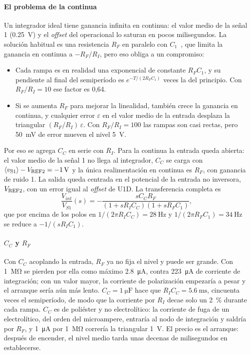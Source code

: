 \paragraph*{El problema de la continua} Un integrador ideal tiene ganancia infinita en continua: el valor medio de la señal 1 (\SI{0,25}{\volt}) y el \emph{offset} del operacional lo saturan en pocos milisegundos. La solución habitual es una resistencia $R_F$ en paralelo con $C_1$~\cite{linares-intder}, que limita la ganancia en continua a $-R_F/R_I$, pero eso obliga a un compromiso:
\begin{itemize}[leftmargin=*, nosep]
    \item Cada rampa es en realidad una exponencial de constante $R_F C_1$, y su pendiente al final del semiperíodo es $e^{-T/(2 R_F C_1)}$ veces la del principio. Con $R_F/R_I = 10$ ese factor es 0,64.
    \item Si se aumenta $R_F$ para mejorar la linealidad, también crece la ganancia en continua, y cualquier error $\varepsilon$ en el valor medio de la entrada desplaza la triangular $(R_F/R_I)\,\varepsilon$. Con $R_F/R_I = 100$ las rampas son casi rectas, pero \SI{50}{\milli\volt} de error mueven el nivel \SI{5}{\volt}.
\end{itemize}
Por eso se agrega $C_C$ en serie con $R_I$. Para la continua la entrada queda abierta: el valor medio de la señal 1 no llega al integrador, $C_C$ se carga con $\langle v_{\mathrm{S1}} \rangle - V_{\mathrm{REF2}} = \SI{-1}{\volt}$ y la única realimentación en continua es $R_F$, con ganancia de ruido 1. La salida queda centrada en el potencial de la entrada no inversora, $V_{\mathrm{REF2}}$, con un error igual al \emph{offset} de U1D. La transferencia completa es
\begin{equation}
\frac{V_{int}}{V_{S1}}(s) = -\frac{s C_C R_F}{(1 + s R_I C_C)(1 + s R_F C_1)},
\end{equation}
que por encima de los polos en $1/(2\pi R_I C_C) = \SI{28}{\hertz}$ y $1/(2\pi R_F C_1) = \SI{34}{\hertz}$ se reduce a $-1/(s R_I C_1)$.

\paragraph*{$C_C$ y $R_F$} Con $C_C$ acoplando la entrada, $R_F$ ya no fija el nivel y puede ser grande. Con \SI{1}{\mega\ohm} se pierden por ella como máximo \SI{2,8}{\micro\ampere}, contra \SI{223}{\micro\ampere} de corriente de integración; con un valor mayor, la corriente de polarización empezaría a pesar y el arranque sería aún más lento. $C_C = \SI{1}{\micro\farad}$ hace que $R_I C_C = \SI{5,6}{\milli\second}$, cincuenta veces el semiperíodo, de modo que la corriente por $R_I$ decae solo un \SI{2}{\percent} durante cada rampa. $C_C$ es de poliéster y no electrolítico: la corriente de fuga de un electrolítico, del orden del microampere, entraría al nodo de integración y saldría por $R_F$, y \SI{1}{\micro\ampere} por \SI{1}{\mega\ohm} correría la triangular \SI{1}{\volt}. El precio es el arranque: después de encender, el nivel medio tarda unas decenas de milisegundos en establecerse.

